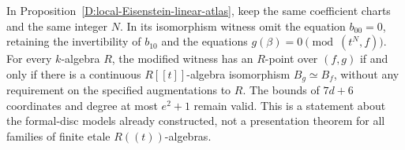 \begin{corollary}
\label{D:unpointed-Eisenstein-witness}
In Proposition~\ref{D:local-Eisenstein-linear-atlas}, keep the same
coefficient charts and the same integer $N$. In its isomorphism
witness omit the equation $b_{00}=0$, retaining the invertibility
of $b_{10}$ and the equations $g(\beta)=0\pmod{(t^N,f)}$.
For every $k$-algebra $R$, the modified witness has an $R$-point
over $(f,g)$ if and only if there is a continuous
$R[[t]]$-algebra isomorphism $B_g\simeq B_f$, without any
requirement on the specified augmentations to $R$.
The bounds of $7d+6$ coordinates and degree at most $e^2+1$
remain valid. This is a statement about the formal-disc models
already constructed, not a presentation theorem for all families
of finite etale $R((t))$-algebras.
\end{corollary}
